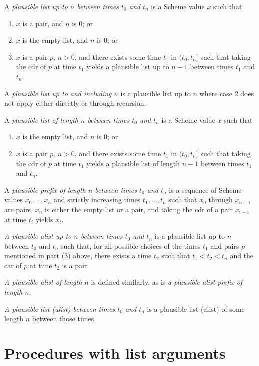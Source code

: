 A \textit{plausible list up to $n$ between times $t_0$ and $t_n$} is a
Scheme value $x$ such that
%
\begin{enumerate}
\item $x$ is a pair, and $n$ is $0$; or
\item $x$ is the empty list, and $n$ is $0$; or
\item $x$ is a pair $p$, $n > 0$, and there exists some time
  $t_1$ in $(t_0,t_n]$ such that taking the cdr of $p$ at
  time $t_1$ yields a plausible list up to $n-1$ between
  times $t_1$ and $t_n$.
\end{enumerate}

A \textit{plausible list up to and including $n$} is a plausible list
up to $n$ where case 2 does not apply either directly or through
recursion.

A \textit{plausible list of length $n$ between times $t_0$ and $t_n$}
is a Scheme value $x$ such that

\begin{enumerate}
\item $x$ is the empty list, and $n$ is $0$; or
\item $x$ is a pair $p$, $n > 0$, and there exists some time
  $t_1$ in $(t_0,t_n]$ such that taking the cdr of $p$ at
  time $t_1$ yields a plausible list of length $n-1$
  between times $t_1$ and $t_n$.
\end{enumerate}

A \textit{plausible prefix of length $n$ between times $t_0$ and
  $t_n$} is a sequence of Scheme values $x_0,\ldots,x_n$ and strictly
increasing times $t_1,\ldots,t_n$ such that $x_0$ through $x_{n-1}$
are pairs, $x_n$ is either the empty list or a pair, and taking the
cdr of a pair $x_{i-1}$ at time $t_i$ yields $x_i$.

\textit{A plausible alist up to $n$ between times $t_0$ and $t_n$} is
a plausible list up to $n$ between $t_0$ and $t_n$ such that, for all
possible choices of the times $t_1$ and pairs $p$ mentioned in part
(3) above, there exists a time $t_2$ such that $t_1 < t_2 < t_n$ and
the car of $p$ at time $t_2$ is a pair.

\textit{A plausible alist of length $n$} is defined similarly, as is
\textit{a plausible alist prefix of length $n$}.

\textit{A plausible list (alist) between times $t_0$ and $t_n$} is a
plausible list (alist) of some length $n$ between those times.

\section{Procedures with list arguments}
\label{proceduresmutablelistargumentssection}

